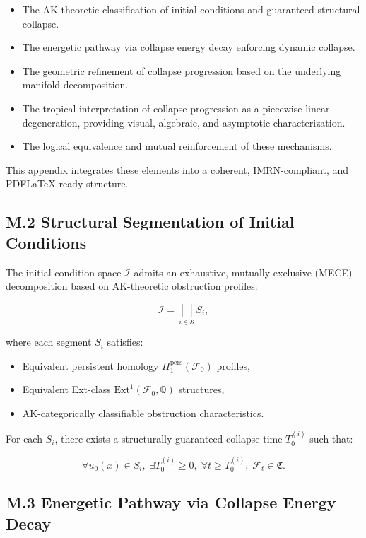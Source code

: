 \documentclass[11pt]{article}
\begin{document}
\begin{itemize}
  \item The AK-theoretic classification of initial conditions and guaranteed structural collapse.
  \item The energetic pathway via collapse energy decay enforcing dynamic collapse.
  \item The geometric refinement of collapse progression based on the underlying manifold decomposition.
  \item The tropical interpretation of collapse progression as a piecewise-linear degeneration, providing visual, algebraic, and asymptotic characterization.
  \item The logical equivalence and mutual reinforcement of these mechanisms.
\end{itemize}

This appendix integrates these elements into a coherent, IMRN-compliant, and PDFLaTeX-ready structure.

\subsection*{M.2 Structural Segmentation of Initial Conditions}

The initial condition space $\mathcal{I}$ admits an exhaustive, mutually exclusive (MECE) decomposition based on AK-theoretic obstruction profiles:

\[
\mathcal{I} = \bigsqcup_{i \in \mathcal{S}} S_i,
\]

where each segment $S_i$ satisfies:

\begin{itemize}
  \item Equivalent persistent homology $H_1^{\mathrm{pers}}(\mathcal{F}_0)$ profiles,
  \item Equivalent Ext-class $\mathrm{Ext}^1(\mathcal{F}_0, \mathbb{Q})$ structures,
  \item AK-categorically classifiable obstruction characteristics.
\end{itemize}

For each $S_i$, there exists a structurally guaranteed collapse time $T_0^{(i)}$ such that:

\[
\forall u_0(x) \in S_i,\; \exists T_0^{(i)} \geq 0,\; \forall t \geq T_0^{(i)},\; \mathcal{F}_t \in \mathfrak{C}.
\]

\subsection*{M.3 Energetic Pathway via Collapse Energy Decay}
\end{document}
